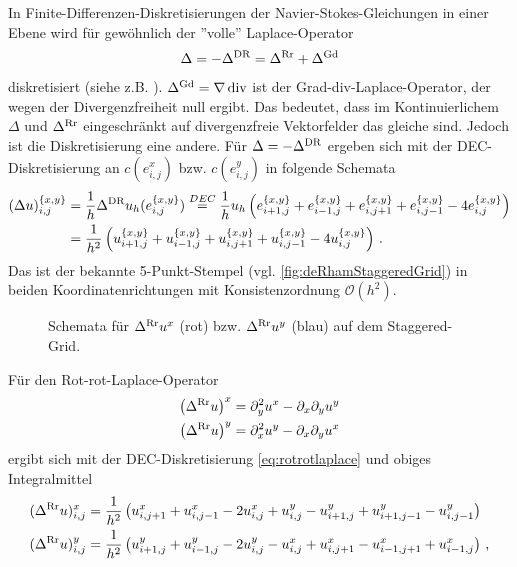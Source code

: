 \documentclass[a4paper,11pt]{scrartcl}
\newcommand{\U}{u} %
\newcommand{\landau}{\mathcal{O}}
\renewcommand{\div}{\operatorname{div}} %
\newcommand{\lrr}{\Delta^{\textup{Rr}}} %
\newcommand{\lgd}{\Delta^{\textup{Gd}}} %
\newcommand{\ldr}{\Delta^{\textup{DR}}} %
\newcommand{\formComma}{\,\text{,}}
\newcommand{\formPeriod}{\,\text{.}}
\begin{document}
    In Finite-Differenzen-Diskretisierungen der Navier-Stokes-Gleichungen in einer Ebene wird für gewöhnlich der ''volle'' Laplace-Operator
    \begin{align}
      \Delta = -\ldr = \lrr + \lgd
    \end{align}
    diskretisiert (siehe z.B. \cite{Armfield1991}).
    \( \lgd = \nabla\div \) ist der Grad-div-Laplace-Operator, der wegen der Divergenzfreiheit null ergibt.
    Das bedeutet, dass im Kontinuierlichem \( \Delta \) und \( \lrr \) eingeschränkt auf divergenzfreie Vektorfelder das gleiche sind.
    Jedoch ist die Diskretisierung eine andere.
    Für \( \Delta = -\ldr \) ergeben sich mit der DEC-Diskretisierung an \( c(e^{x}_{i,j}) \) bzw. \(c(e^{y}_{i,j})\) in \cite{Nestler2016} folgende
    Schemata
    \begin{align}
      (\Delta u)^{\{x,y\}}_{i,j} &= \frac{1}{h}\ldr\U_{h}(e^{\{x,y\}}_{i,j})
                                \overset{DEC}{=} \frac{1}{h}\U_{h}\left( e^{\{x,y\}}_{i+1,j} +  e^{\{x,y\}}_{i-1,j} 
                                                      +e^{\{x,y\}}_{i,j+1} +  e^{\{x,y\}}_{i,j-1}
                                                      -4e^{\{x,y\}}_{i,j}\right) \\
                      &= \frac{1}{h^{2}}\left( u^{\{x,y\}}_{i+1,j} +  u^{\{x,y\}}_{i-1,j} 
                                                      +u^{\{x,y\}}_{i,j+1} +  u^{\{x,y\}}_{i,j-1}
                                                      -4u^{\{x,y\}}_{i,j} \right) \formPeriod
    \end{align}
    Das ist der bekannte 5-Punkt-Stempel (vgl. \autoref{fig:deRhamStaggeredGrid}) in beiden Koordinatenrichtungen mit Konsistenzordnung \( \landau(h^{2}) \).
    \begin{figure}[tbp]
      \centering
      
      \caption{Schemata für \( \lrr u^{x} \) (rot) bzw. \( \lrr u^{y} \) (blau) auf dem Staggered-Grid.}
      \label{fig:rotrotStaggeredGrid}
    \end{figure}
    Für den Rot-rot-Laplace-Operator
    \begin{align}
      \left( \lrr u \right)^{x} &= \partial_{y}^{2}u^{x} - \partial_{x}\partial_{y}u^{y} \\
      \left( \lrr u \right)^{y} &= \partial_{x}^{2}u^{y} - \partial_{x}\partial_{y}u^{x}
    \end{align}
    ergibt sich mit der DEC-Diskretisierung \eqref{eq:rotrotlaplace} und obiges Integralmittel 
    \begin{align}
      (\lrr u)^{x}_{i,j} &= \frac{1}{h^{2}}\left( u^{x}_{i,j+1} +  u^{x}_{i,j-1} - 2u^{x}_{i,j}
                                                 +u^{y}_{i,j} - u^{y}_{i+1,j}
                                                 +u^{y}_{i+1,j-1} -u^{y}_{i,j-1} \right) \\
      (\lrr u)^{y}_{i,j} &= \frac{1}{h^{2}}\left( u^{y}_{i+1,j} +  u^{y}_{i-1,j} - 2u^{y}_{i,j}
                                                 -u^{x}_{i,j} + u^{x}_{i,j+1}
                                                 -u^{x}_{i-1,j+1} +u^{x}_{i-1,j} \right) \formComma
    \end{align}
\end{document}
